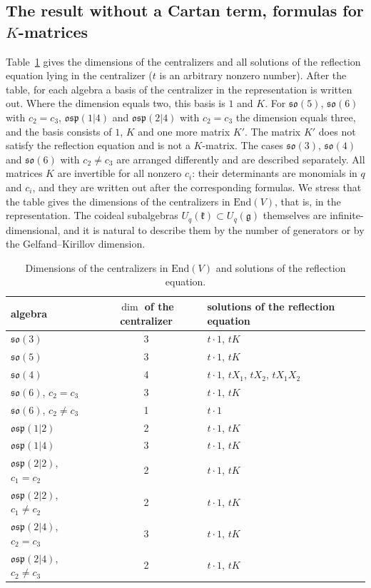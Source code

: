 \documentclass[12pt,a4paper]{article}
\newcommand{\g}{\mathfrak{g}}
\newcommand{\kk}{\mathfrak{k}}
\newcommand{\so}{\mathfrak{so}}
\newcommand{\osp}{\mathfrak{osp}}
\newcommand{\Uq}{U_q}
\begin{document}
\subsection{The result without a Cartan term, formulas for $K$-matrices}\label{ss:res}
Table~\ref{t:res} gives the dimensions of the centralizers and all solutions of the reflection equation lying in the centralizer ($t$ is an arbitrary nonzero number). After the table, for each algebra a basis of the centralizer in the representation is written out. Where the dimension equals two, this basis is $1$ and $K$. For $\so(5)$, $\so(6)$ with $c_2=c_3$, $\osp(1|4)$ and $\osp(2|4)$ with $c_2=c_3$ the dimension equals three, and the basis consists of $1$, $K$ and one more matrix $K'$. The matrix $K'$ does not satisfy the reflection equation and is not a $K$-matrix. The cases $\so(3)$, $\so(4)$ and $\so(6)$ with $c_2\neq c_3$ are arranged differently and are described separately. All matrices $K$ are invertible for all nonzero $c_i$: their determinants are monomials in $q$ and $c_i$, and they are written out after the corresponding formulas. We stress that the table gives the dimensions of the centralizers in $\mathrm{End}(V)$, that is, in the representation. The coideal subalgebras $\Uq(\kk)\subset\Uq(\g)$ themselves are infinite-dimensional, and it is natural to describe them by the number of generators or by the Gelfand--Kirillov dimension.



\begin{table}[H]
\centering\small
\begin{tabular}{@{}lcl@{}}
\toprule
algebra & $\dim$ of the centralizer & solutions of the reflection equation\\
\midrule
$\so(3)$ & 3 & $t\cdot1$, $tK$\\
$\so(5)$ & 3 & $t\cdot1$, $tK$\\
$\so(4)$ & 4 & $t\cdot1$, $tX_1$, $tX_2$, $tX_1X_2$\\
$\so(6)$, $c_2=c_3$ & 3 & $t\cdot1$, $tK$\\
$\so(6)$, $c_2\neq c_3$ & 1 & $t\cdot1$\\
$\osp(1|2)$ & 2 & $t\cdot1$, $tK$\\
$\osp(1|4)$ & 3 & $t\cdot1$, $tK$\\
$\osp(2|2)$, $c_1=c_2$ & 2 & $t\cdot1$, $tK$\\
$\osp(2|2)$, $c_1\neq c_2$ & 2 & $t\cdot1$, $tK$\\
$\osp(2|4)$, $c_2=c_3$ & 3 & $t\cdot1$, $tK$\\
$\osp(2|4)$, $c_2\neq c_3$ & 2 & $t\cdot1$, $tK$\\
\bottomrule
\end{tabular}
\caption{Dimensions of the centralizers in $\mathrm{End}(V)$ and solutions of the reflection equation.}\label{t:res}
\end{table}
\end{document}
